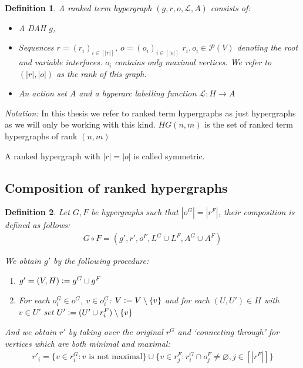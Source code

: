 \documentclass[12pt]{article}
\newtheorem{definition}{Definition}[section]
\newcommand{\defeq}{\vcentcolon=}
\renewcommand{\P}{\mathcal{P}}
\newcommand{\1}{\mathbbm{1}}
\renewcommand{\L}{\mathcal{L}}
\begin{document}
\begin{definition}
A \emph{ranked term hypergraph} $(g, r, o, \L, A)$ consists of:
\begin{itemize}
\item A DAH $g$,
\item Sequences $r = (r_i)_{i\in[|r|]}$, $o = (o_i)_{i\in[|o|]}$ $r_i, o_i\in \P(V)$ denoting the root and variable interfaces. $o_i$ contains only maximal vertices. We refer to $(|r|, |o|)$ as the \emph{rank} of this graph.
\item An action set $A$ and a hyperarc labelling function $\L: H\to A$
\end{itemize}
\end{definition}
\emph{Notation:} In this thesis we refer to ranked term hypergraphs as just hypergraphs as we will only be working with this kind. $HG(n,m)$ is the set of ranked term  hypergraphs of rank $(n,m)$

A ranked hypergraph with $|r| = |o|$ is called symmetric.

\subsection{Composition of ranked hypergraphs}
\begin{definition}
Let $G, F$ be hypergraphs such that $|o^G| = |r^F|$, their composition is defined as follows:
\begin{align}
    G\circ F = (g', r', o^F, L^G\cup L^F, A^G\cup A^F)
\end{align}

We obtain $g'$ by the following procedure:
\begin{enumerate}
    \item $g' = (V,H) \defeq g^G \sqcup g^F$
    \item For each $o^G_i\in o^G$, $v\in o^G_i$: $V\defeq V\setminus \{v\}$ and for each $(U, U')\in H$ with $v\in U'$ set $U' \defeq (U' \cup r^F_i) \setminus \{v\}$\\
\end{enumerate}

And we obtain $r'$ by taking over the original $r^G$ and `connecting through' for vertices which are both minimal and maximal:
\begin{align*}
    r'_i = \{v\in r_i^G: v \text{ is not maximal}\}\cup \{v\in r_j^F : r^G_i \cap o_j^F \neq \varnothing,  j\in[|r^F|]\}
\end{align*}
\end{definition}
\end{document}
